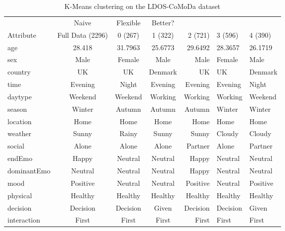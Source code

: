 \documentclass{article}
\begin{document}
\begin{table}[t]
\caption{K-Means clustering on the LDOS-CoMoDa dataset}
\label{kmeans}
\vskip 0.15in
\begin{center}
\begin{small}
\begin{sc}
\begin{tabular}{lcccr}
\hline
\abovespace\belowspace
 & Naive & Flexible & Better? \\
Attribute & Full Data (2296) & 0 (267) & 1 (322) & 2 (721) & 3 (596) & 4 (390) \\
\hline
\abovespace
age             &  28.418  &  31.7963  &  25.6773  &  29.6492  &  28.3657  &  26.1719 \\
sex             &    Male  &  Female   &    Male   &    Male   &   Female  &    Male \\
country         &      UK  &       UK  &  Denmark  &      UK   &      UK   & Denmark \\
time            & Evening  &    Night  &  Evening  &  Evening  &  Evening  &    Night \\
daytype         & Weekend  &  Weekend  &  Working  &  Working  &  Working  &  Weekend \\
season          &  Winter  &   Autumn  &   Autumn  &   Autumn  &   Winter  &   Winter \\
location        &    Home  &     Home  &     Home  &     Home  &     Home  &     Home \\
weather         &   Sunny  &    Rainy  &    Sunny  &    Sunny  &   Cloudy  &   Cloudy \\
social          &   Alone  &    Alone  &    Alone  &  Partner  &    Alone  &  Partner \\
endEmo          &   Happy  &  Neutral  &  Neutral  &    Happy  &  Neutral  &  Neutral \\
dominantEmo     & Neutral  &  Neutral  &  Neutral  &    Happy  &  Neutral  &  Neutral \\
mood            &Positive  &  Neutral  &  Neutral  & Positive  &  Neutral  & Positive \\
physical        & Healthy  & Healthy   & Healthy   & Healthy   & Healthy   & Healthy \\
decision        &Decision  & Decision  &    Given  & Decision  & Decision  &    Given \\
\belowspace
interaction     &   First  &    First  &    First  &    First  &    First  &    First \\
\hline
\end{tabular}
\end{sc}
\end{small}
\end{center}
\vskip -0.1in
\end{table}
\end{document}
